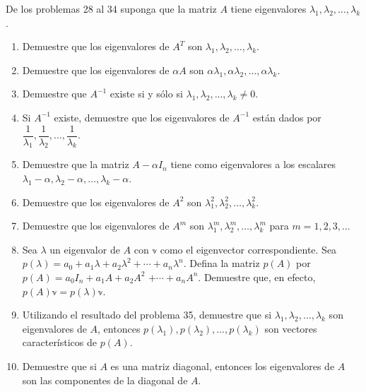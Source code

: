 De los problemas 28 al 34 suponga que la matriz $A$ tiene eigenvalores $\lambda_{1}, \lambda_{2}, \dots, \lambda_{k}$.
\begin{enumerate}[resume]
    \item Demuestre que los eigenvalores de $A^{T}$ son $\lambda_{1}, \lambda_{2}, \dots, \lambda_{k}$.\newpage
    \item Demuestre que los eigenvalores de $\alpha A$ son $\alpha \lambda_{1}, \alpha \lambda_{2}, \dots, \alpha \lambda_{k}$.
    \item Demuestre que $A^{-1}$ existe si y sólo si $\lambda_{1}, \lambda_{2}, \dots, \lambda_{k} \neq 0$.
    \item Si $A^{-1}$ existe, demuestre que los eigenvalores de $A^{-1}$ están dados por $\dfrac{1}{\lambda_{1}}, \dfrac{1}{\lambda_{2}}, \dots, \dfrac{1}{\lambda_{k}}$.
    \item Demuestre que la matriz $A-\alpha I_n$ tiene como eigenvalores a los escalares $\lambda_{1}-\alpha, \lambda_{2}-\alpha, \dots, \lambda_{k}-\alpha$.
    \item Demuestre que los eigenvalores de $A^{2}$ son $\lambda_{1}^{2}, \lambda_{2}^{2}, \dots, \lambda_{k}^{2}$.
    \item Demuestre que los eigenvalores de $A^{m}$ son $\lambda_{1}^{m}, \lambda_{2}^{m}, \dots, \lambda_{k}^{m}$ para $m=1,2,3, \dots$
    \item Sea $\lambda$ un eigenvalor de $A$ con $\mathbb{v}$ como el eigenvector correspondiente. Sea $p(\lambda)=a_{0}+a_{1} \lambda+a_{2} \lambda^{2}+\cdots+a_{n} \lambda^{n}$. Defina la matriz $p(A)$ por $p(A)=a_{0} I_n+a_{1} A+a_{2} A^{2}$ $+\cdots+a_{n} A^{n}$. Demuestre que, en efecto, $p(A) \mathbb{v}=p(\lambda) \mathbb{v}$.
    \item Utilizando el resultado del problema 35, demuestre que si $\lambda_{1}, \lambda_{2}, \dots, \lambda_{k}$ son eigenvalores de $A$, entonces $p\left(\lambda_{1}\right), p\left(\lambda_{2}\right), \dots, p\left(\lambda_{k}\right)$ son vectores característicos de $p(A)$.
    \item Demuestre que si $A$ es una matriz diagonal, entonces los eigenvalores de $A$ son las componentes de la diagonal de $A$.

\end{enumerate}

